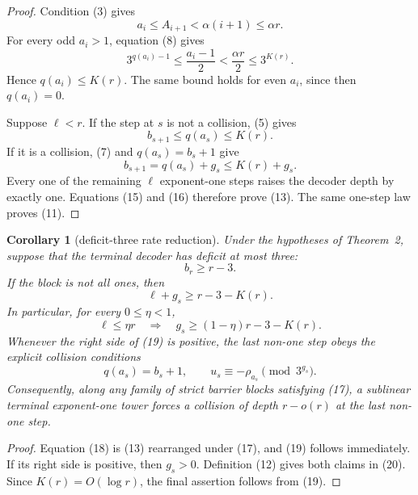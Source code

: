 \documentclass[11pt]{article}
\newtheorem{corollary}[theorem]{Corollary}
\begin{document}
\begin{proof}
Condition (3) gives
\[
  a_i\leq A_{i+1}<\alpha(i+1)\leq\alpha r.
  \tag{14}
\]
For every odd $a_i>1$, equation (8) gives
\[
  3^{q(a_i)-1}
  \leq\frac{a_i-1}{2}
  <\frac{\alpha r}{2}
  \leq3^{K(r)}.
\]
Hence $q(a_i)\leq K(r)$.  The same bound holds for even $a_i$, since then
$q(a_i)=0$.

Suppose $\ell<r$.  If the step at $s$ is not a collision, (5) gives
\[
  b_{s+1}\leq q(a_s)\leq K(r).
  \tag{15}
\]
If it is a collision, (7) and $q(a_s)=b_s+1$ give
\[
  b_{s+1}=q(a_s)+g_s\leq K(r)+g_s.
  \tag{16}
\]
Every one of the remaining $\ell$ exponent-one steps raises the decoder
depth by exactly one.  Equations (15) and (16) therefore prove (13).  The
same one-step law proves (11).
\end{proof}

\begin{corollary}[deficit-three rate reduction]
Under the hypotheses of Theorem~2, suppose that the terminal decoder has
deficit at most three:
\[
  b_r\geq r-3.
  \tag{17}
\]
If the block is not all ones, then
\[
\boxed{
  \ell+g_s
  \geq r-3-K(r).}
\tag{18}
\]
In particular, for every $0\leq\eta<1$,
\[
  \ell\leq\eta r
  \quad\Longrightarrow\quad
  g_s\geq(1-\eta)r-3-K(r).
  \tag{19}
\]
Whenever the right side of (19) is positive, the last non-one step obeys the
explicit collision conditions
\[
  q(a_s)=b_s+1,
  \qquad
  u_s\equiv-\rho_{a_s}\pmod {3^{g_s}}.
  \tag{20}
\]
Consequently, along any family of strict barrier blocks satisfying (17), a
sublinear terminal exponent-one tower forces a collision of depth
$r-o(r)$ at the last non-one step.
\end{corollary}

\begin{proof}
Equation (18) is (13) rearranged under (17), and (19) follows immediately.
If its right side is positive, then $g_s>0$.  Definition (12) gives both
claims in (20).  Since $K(r)=O(\log r)$, the final assertion follows from
(19).
\end{proof}
\end{document}
